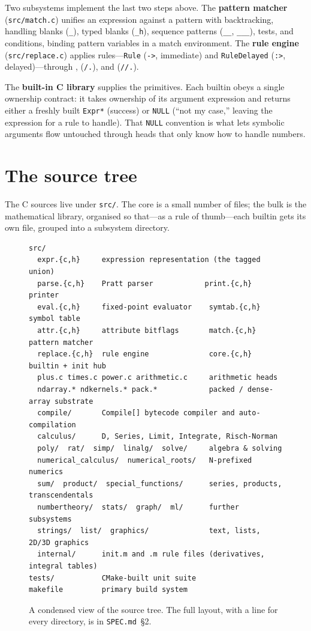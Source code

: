 Two subsystems implement the last two steps above. The \textbf{pattern matcher}
(\texttt{src/match.c}) unifies an expression against a pattern with backtracking,
handling blanks (\texttt{\_}), typed blanks (\texttt{\_h}), sequence patterns
(\texttt{\_\_}, \texttt{\_\_\_}), tests, and conditions, binding pattern variables in
a match environment. The \textbf{rule engine} (\texttt{src/replace.c}) applies
rules---\texttt{Rule} (\texttt{->}, immediate) and \texttt{RuleDelayed}
(\texttt{:>}, delayed)---through ,  (\texttt{/.}), and
 (\texttt{//.}).

The \textbf{built-in C library} supplies the primitives. Each builtin obeys a single
ownership contract: it takes ownership of its argument expression and returns either
a freshly built \texttt{Expr*} (success) or \texttt{NULL} (``not my case,'' leaving
the expression for a rule to handle). That \texttt{NULL} convention is what lets
symbolic arguments flow untouched through heads that only know how to handle numbers.

\section{The source tree}
\label{app:tree}

The C sources live under \texttt{src/}. The core is a small number of files; the bulk
is the mathematical library, organised so that---as a rule of thumb---each builtin
gets its own file, grouped into a subsystem directory.

\begin{figure}[h]
\begin{framed}
\small
\begin{verbatim}
src/
  expr.{c,h}     expression representation (the tagged union)
  parse.{c,h}    Pratt parser            print.{c,h}   printer
  eval.{c,h}     fixed-point evaluator    symtab.{c,h}  symbol table
  attr.{c,h}     attribute bitflags       match.{c,h}   pattern matcher
  replace.{c,h}  rule engine              core.{c,h}    builtin + init hub
  plus.c times.c power.c arithmetic.c     arithmetic heads
  ndarray.* ndkernels.* pack.*            packed / dense-array substrate
  compile/       Compile[] bytecode compiler and auto-compilation
  calculus/      D, Series, Limit, Integrate, Risch-Norman
  poly/  rat/  simp/  linalg/  solve/     algebra & solving
  numerical_calculus/  numerical_roots/   N-prefixed numerics
  sum/  product/  special_functions/      series, products, transcendentals
  numbertheory/  stats/  graph/  ml/      further subsystems
  strings/  list/  graphics/              text, lists, 2D/3D graphics
  internal/      init.m and .m rule files (derivatives, integral tables)
tests/           CMake-built unit suite
makefile         primary build system
\end{verbatim}
\end{framed}
\caption{A condensed view of the source tree. The full layout, with a line for every
directory, is in \texttt{SPEC.md}~\S2.}
\label{fig:tree}
\end{figure}

